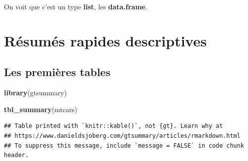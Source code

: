 \documentclass[
]{book}
\newenvironment{Shaded}{\begin{snugshade}}{\end{snugshade}}
\newcommand{\FunctionTok}[1]{\textcolor[rgb]{0.13,0.29,0.53}{\textbf{#1}}}
\newcommand{\NormalTok}[1]{#1}
\begin{document}
On voit que c'est un type \textbf{list}, les \textbf{data.frame}.

\hypertarget{ruxe9sumuxe9s-rapides-descriptives}{%
\chapter{Résumés rapides descriptives}\label{ruxe9sumuxe9s-rapides-descriptives}}

\hypertarget{les-premiuxe8res-tables}{%
\section{Les premières tables}\label{les-premiuxe8res-tables}}

\begin{Shaded}
\begin{Highlighting}[]
\FunctionTok{library}\NormalTok{(gtsummary)}
\end{Highlighting}
\end{Shaded}

\begin{Shaded}
\begin{Highlighting}[]
\FunctionTok{tbl\_summary}\NormalTok{(mtcars)}
\end{Highlighting}
\end{Shaded}

\begin{verbatim}
## Table printed with `knitr::kable()`, not {gt}. Learn why at
## https://www.danieldsjoberg.com/gtsummary/articles/rmarkdown.html
## To suppress this message, include `message = FALSE` in code chunk header.
\end{verbatim}
\end{document}
